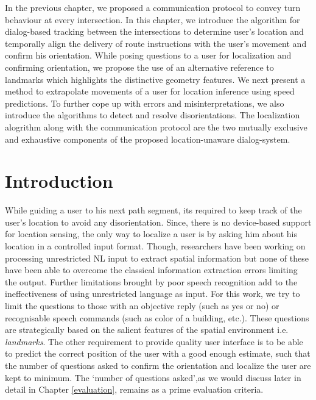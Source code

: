 \documentclass{iitkthesis}
\begin{document}
In the previous chapter, we proposed a communication protocol to convey turn behaviour at every intersection. In this chapter, we introduce the algorithm for dialog-based tracking between the intersections to determine user's location and temporally align the delivery of route instructions with the user's movement and confirm his orientation. While posing questions to a user for localization and confirming orientation, we propose the use of an alternative reference to landmarks which highlights the distinctive geometry features. We next present a method to extrapolate movements of a user for location inference using speed predictions. To further cope up with errors and misinterpretations, we also introduce the algorithms to detect and resolve disorientations. The localization alogrithm along with the communication protocol are the two mutually exclusive and exhaustive components of the proposed location-unaware dialog-system. 

\section{Introduction} 
While guiding a user to his next path segment, its required to keep track of the user's location to avoid any disorientation. Since, there is no device-based support for location sensing, the only way to localize a user is by asking him about his location in a controlled input format. Though, researchers \cite{tellex:language, Kordjamshidi:labelling, matuszek:following} have been working on processing unrestricted NL input to extract spatial information but none of these have been able to overcome the classical information extraction errors limiting the output. Further limitations brought by poor speech recognition add to the ineffectiveness of using unrestricted language as input. 
For this work, we try to limit the questions to those with an objective reply (such as yes or no) or recognisable speech commands (such as color of a building, etc.). These questions are strategically based on the salient features of the spatial environment i.e. \textit{landmarks}. The other requirement to provide quality user interface is to be able to predict the correct position of the user with a good enough estimate, such that the number of questions asked to confirm the orientation and localize the user are kept to minimum. The `number of questions asked',as we would discuss later in detail in Chapter \ref{evaluation}, remains as a prime evaluation criteria.
\end{document}
